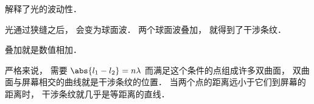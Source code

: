 
解释了光的波动性．

光通过狭缝之后， 会变为球面波． 两个球面波叠加， 就得到了干涉条纹．

叠加就是数值相加．

严格来说， 需要 $\abs{l_1 - l_2} = n\lambda$ 而满足这个条件的点组成许多双曲面， 双曲面与屏幕相交的曲线就是干涉条纹的位置． 当两个点的距离远小于它们到屏幕的距离时， 干涉条纹就几乎是等距离的直线．
